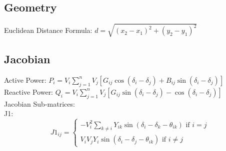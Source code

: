 \documentclass{article}
\begin{document}
	\subsection{Geometry}
	Euclidean Distance Formula: $d = \sqrt{(x_2 - x_1)^2 + (y_2 - y_1)^2}$ \\
	
	\subsection{Jacobian}
	Active Power: $P_i = V_i \sum_{j=1}^{n} V_j[G_{ij} \cos(\delta_i - \delta_j) + B_{ij} \sin(\delta_i - \delta_j)]$ \\
	Reactive Power: $Q_i = V_i \sum_{j=1}^{n} V_j[G_{ij} \sin(\delta_i - \delta_j) - \cos(\delta_i - \delta_j)]$ \\
	Jacobian Sub-matrices: \\
	\noindent
	J1: 
	\begin{equation}
		J1_{ij} = 
		\begin{cases} 
			-V_i^2 \sum_{k \neq i} Y_{ik} \sin (\delta_i - \delta_k - \theta_{ik}) \text{ if } i = j  \\
			V_i V_j Y_i \sin(\delta_i - \delta_j - \theta_{ik}) \text{ if } i \neq j
		\end{cases}
	\end{equation}
	
\end{document}
